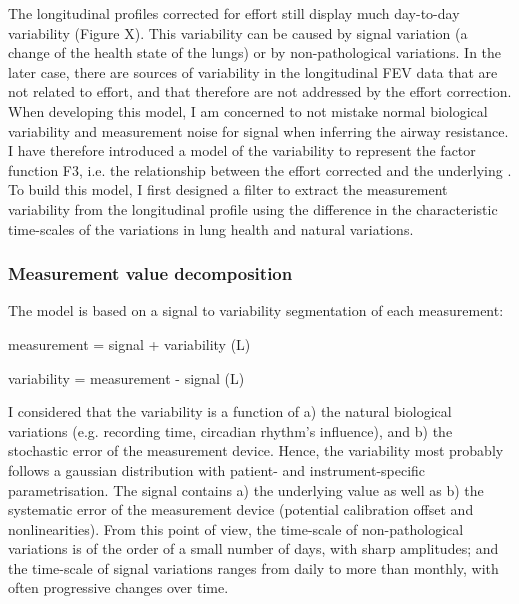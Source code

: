 The longitudinal profiles corrected for effort still display much day-to-day variability (Figure X). This variability can be caused by signal variation (a change of the health state of the lungs) or by non-pathological variations. In the later case, there are sources of variability in the longitudinal FEV data that are not related to effort, and that therefore are not addressed by the effort correction. When developing this model, I am concerned to not mistake normal biological variability and measurement noise for signal when inferring the airway resistance. I have therefore introduced a model of the \F variability to represent the factor function F3, i.e. the relationship between the effort corrected \F and the underlying \F. To build this model, I first designed a filter to extract the measurement variability from the longitudinal profile using the difference in the characteristic time-scales of the variations in lung health and natural variations.

\subsubsection{Measurement value decomposition}
The model is based on a signal to variability segmentation of each measurement:
\begin{center}
    measurement = signal + variability (L)
\end{center}
\begin{center}
    variability = measurement - signal (L)
\end{center}
I considered that the variability is a function of a) the natural biological variations (e.g. recording time, circadian rhythm's influence), and b) the stochastic error of the measurement device. Hence, the variability most probably follows a gaussian distribution with patient- and instrument-specific parametrisation. The signal contains a) the underlying \F value as well as b) the systematic error of the measurement device (potential calibration offset and nonlinearities). From this point of view, the time-scale of non-pathological variations is of the order of a small number of days, with sharp amplitudes; and the time-scale of signal variations ranges from daily to more than monthly, with often progressive changes over time.

